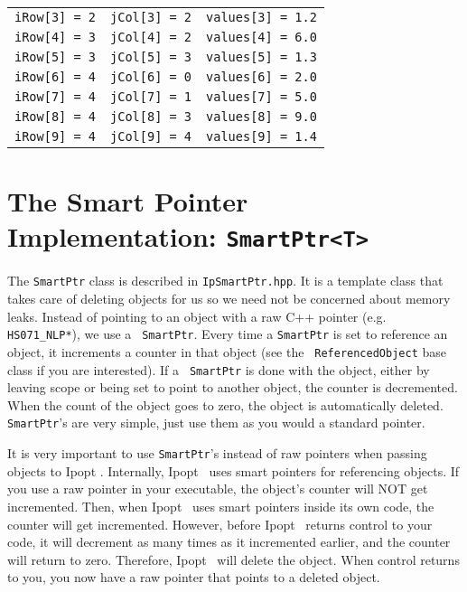\documentclass[10pt]{article}
\newcommand{\Ipopt}{{\sc Ipopt }}
\begin{document}
\begin{footnotesize}
\begin{table}[ht]
\begin{center}
\begin{tabular}{c c c}
{\tt iRow[3] = 2}       &       {\tt jCol[3] = 2}       & {\tt values[3] = 1.2}     \\
{\tt iRow[4] = 3}       &       {\tt jCol[4] = 2}       & {\tt values[4] = 6.0}     \\
{\tt iRow[5] = 3}       &       {\tt jCol[5] = 3}       & {\tt values[5] = 1.3}     \\
{\tt iRow[6] = 4}       &       {\tt jCol[6] = 0}       & {\tt values[6] = 2.0}     \\
{\tt iRow[7] = 4}       &       {\tt jCol[7] = 1}       & {\tt values[7] = 5.0}     \\
{\tt iRow[8] = 4}       &       {\tt jCol[8] = 3}       & {\tt values[8] = 9.0}     \\
{\tt iRow[9] = 4}       &       {\tt jCol[9] = 4}       & {\tt values[9] = 1.4}
\end{tabular}
\end{center}
\end{table}
\end{footnotesize}
\newpage
\section{The Smart Pointer Implementation: {\tt SmartPtr<T>}} \label{app.smart_ptr}

The {\tt SmartPtr} class is described in {\tt IpSmartPtr.hpp}. It is a
template class that takes care of deleting objects for us so we need
not be concerned about memory leaks. Instead of pointing to an object
with a raw C++ pointer (e.g. {\tt HS071\_NLP*}), we use a {\tt
  SmartPtr}.  Every time a {\tt SmartPtr} is set to reference an
object, it increments a counter in that object (see the {\tt
  ReferencedObject} base class if you are interested). If a {\tt
  SmartPtr} is done with the object, either by leaving scope or being
set to point to another object, the counter is decremented. When the
count of the object goes to zero, the object is automatically deleted.
{\tt SmartPtr}'s are very simple, just use them as you would a
standard pointer.

It is very important to use {\tt SmartPtr}'s instead of raw pointers
when passing objects to \Ipopt. Internally, \Ipopt\ uses smart
pointers for referencing objects. If you use a raw pointer in your
executable, the object's counter will NOT get incremented. Then, when
\Ipopt\ uses smart pointers inside its own code, the counter will get
incremented. However, before \Ipopt\ returns control to your code, it
will decrement as many times as it incremented earlier, and the
counter will return to zero. Therefore, \Ipopt\ will delete the
object. When control returns to you, you now have a raw pointer that
points to a deleted object.
\end{document}
